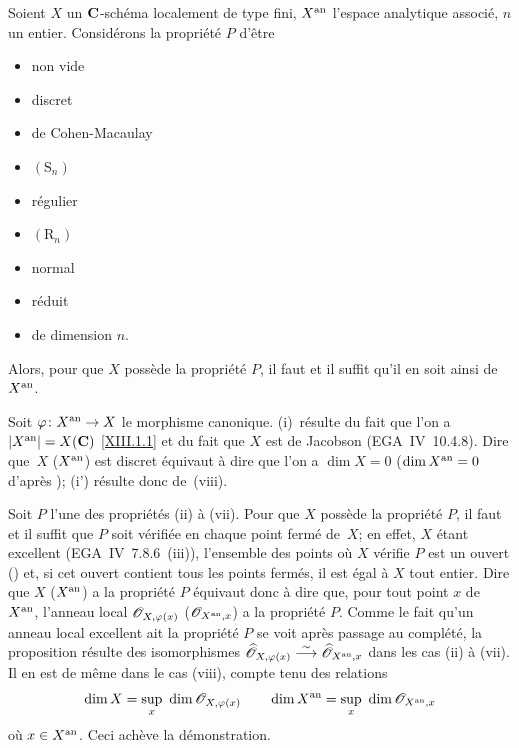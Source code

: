 \begin{proposition}
\label{XII.2.1}
Soient $X$ un $\mathbf{C}$-sch\'ema localement de type fini, $X^{\mathrm{an}}$
l'espace analytique associ\'e, $n$ un entier. Consid\'erons la
propri\'et\'e $P$ d'\^etre
\begin{itemize}
\item[(i)] non vide
\item[(i')] discret
\item[(ii)] de Cohen-Macaulay
\item[(iii)] $(\mathrm{S}_n)$
\item[(iv)] r\'egulier
\item[(v)] $(\mathrm{R}_n)$
\item[(vi)] normal
\item[(vii)] r\'eduit
\item[(viii)] de dimension $n$.
\end{itemize}
Alors, pour que $X$ poss\`ede la propri\'et\'e $P$, il faut et
il suffit qu'il en soit ainsi de~$X^{\mathrm{an}}$.
\end{proposition}

Soit $\varphi\colon X^{\an}\to X$ le morphisme
canonique. (i)~r\'esulte du fait que l'on a $|X^{\mathrm{an}}|=X(\mathbf{C} )$
\eqref{XIII.1.1} et du fait que $X$ est de Jacobson (EGA~IV~10.4.8). Dire que~$X$
(\resp $X^{\mathrm{an}}$) est discret \'equivaut \`a dire que l'on a $\dim
X=0$ (\resp $\dim X^{\mathrm{an}}=0$ d'apr\`es \cite[~\S 4~cor.\, 6]{XII.4}); (i')
r\'esulte donc de~(viii).

Soit $P$ l'une des propri\'et\'es (ii) \`a (vii). Pour que $X$
poss\`ede la propri\'et\'e $P$, il faut et il suffit que $P$
soit v\'erifi\'ee en chaque point ferm\'e de~$X$; en effet, $X$
\'etant excellent (EGA~IV~7.8.6~(iii)), l'ensemble des points
o\`u $X$ v\'erifie $P$ est un ouvert (\loccit) et, si cet ouvert
contient tous les points ferm\'es, il est \'egal \`a $X$ tout
entier. Dire que $X$ (\resp $X^{\mathrm{an}}$) a la propri\'et\'e $P$
\'equivaut donc \`a dire que, pour tout point $x$ de~$X^{\mathrm{an}}$,
l'anneau local $\cal{O}_{X,\varphi (x)}$ (\resp $\cal{O}_{X^{\an},x}$)
a la propri\'et\'e $P$. Comme le fait qu'un anneau local excellent
ait la propri\'et\'e $P$ se voit apr\`es passage au
compl\'et\'e, la proposition r\'esulte des isomorphismes
$\widehat{\cal{O}}_{X,\varphi(x)}\isomto\widehat{\cal{O}}_{X^{\an},x}$
dans les cas (ii) \`a (vii). Il en est de m\^eme dans le cas
(viii), compte tenu des relations
$$
\dim X=\sup_x~\dim \cal{O}_{X,\varphi (x)}\qquad \dim
X^{\an}=\sup_x~\dim \cal{O}_{X^{\an},x}
$$
o\`u $x\in X^{\mathrm{an}}$. Ceci ach\`eve la d\'emonstration.

